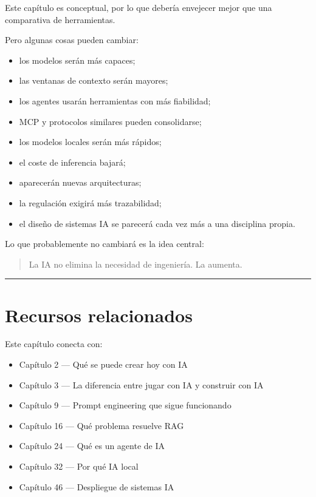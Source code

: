 Este capítulo es conceptual, por lo que debería envejecer mejor que una
comparativa de herramientas.

Pero algunas cosas pueden cambiar:

\begin{itemize}
\tightlist
\item
  los modelos serán más capaces;
\item
  las ventanas de contexto serán mayores;
\item
  los agentes usarán herramientas con más fiabilidad;
\item
  MCP y protocolos similares pueden consolidarse;
\item
  los modelos locales serán más rápidos;
\item
  el coste de inferencia bajará;
\item
  aparecerán nuevas arquitecturas;
\item
  la regulación exigirá más trazabilidad;
\item
  el diseño de sistemas IA se parecerá cada vez más a una disciplina
  propia.
\end{itemize}

Lo que probablemente no cambiará es la idea central:

\begin{quote}
La IA no elimina la necesidad de ingeniería. La aumenta.
\end{quote}

\begin{center}\rule{0.5\linewidth}{0.5pt}\end{center}

\section{Recursos relacionados}\label{recursos-relacionados}

Este capítulo conecta con:

\begin{itemize}
\tightlist
\item
  Capítulo 2 --- Qué se puede crear hoy con IA
\item
  Capítulo 3 --- La diferencia entre jugar con IA y construir con IA
\item
  Capítulo 9 --- Prompt engineering que sigue funcionando
\item
  Capítulo 16 --- Qué problema resuelve RAG
\item
  Capítulo 24 --- Qué es un agente de IA
\item
  Capítulo 32 --- Por qué IA local
\item
  Capítulo 46 --- Despliegue de sistemas IA
\end{itemize}

